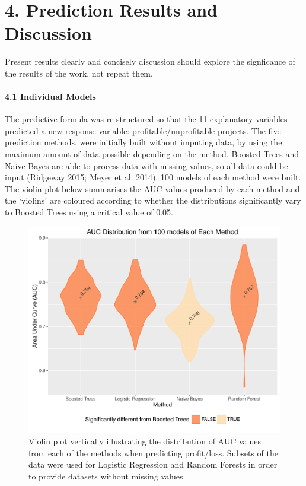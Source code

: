 \documentclass[]{elsarticle} %
\makeatletter
\def\maxwidth{\ifdim\Gin@nat@width>\linewidth\linewidth
\else\Gin@nat@width\fi}
\let\Oldincludegraphics\includegraphics
\renewcommand{\includegraphics}[1]{\Oldincludegraphics[width=\maxwidth]{#1}}
\makeatother
\begin{document}
\section{4. Prediction Results and
Discussion}\label{prediction-results-and-discussion}

Present results clearly and concisely discussion should explore the
signficance of the results of the work, not repeat them.

\paragraph{4.1 Individual Models}\label{individual-models}

The predictive formula was re-structured so that the 11 explanatory
variables predicted a new response variable: profitable/unprofitable
projects. The five prediction methods, were initially built without
imputing data, by using the maximum amount of data possible depending on
the method. Boosted Trees and Naive Bayes are able to process data with
missing values, so all data could be input (Ridgeway 2015; Meyer et al.
2014). 100 models of each method were built. The violin plot below
summarises the AUC values produced by each method and the `violins' are
coloured according to whether the distributions significantly vary to
Boosted Trees using a critical value of 0.05.

\begin{figure}[htbp]
\centering
\includegraphics{Consulting_Profitability_Paper_files/figure-latex/reduced_violin-1.pdf}
\caption{Violin plot vertically illustrating the distribution of AUC
values from each of the methods when predicting profit/loss. Subsets of
the data were used for Logistic Regression and Random Forests in order
to provide datasets without missing values.}
\end{figure}
\end{document}
